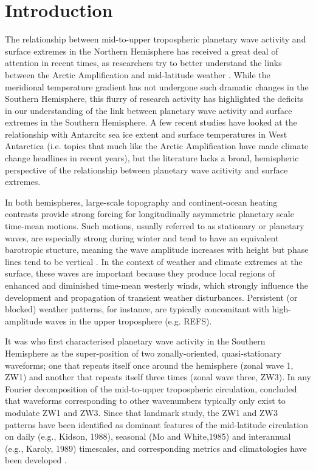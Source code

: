 \section{Introduction}\label{s:introduction}

The relationship between mid-to-upper tropospheric planetary wave activity and surface extremes in the Northern Hemisphere has received a great deal of attention in recent times, as researchers try to better understand the links between the Arctic Amplification and mid-latitude weather \citep[e.g.][]{Cohen2014,Screen2014}. While the meridional temperature gradient has not undergone such dramatic changes in the Southern Hemisphere, this flurry of research activity has highlighted the deficits in our understanding of the link between planetary wave activity and surface extremes in the Southern Hemisphere. A few recent studies have looked at the relationship with Antarcitc sea ice extent \citep{Raphael2007,Raphael2014} and surface temperatures in West Antarctica \citep{Ding2011,Ding2013} (i.e. topics that much like the Arctic Amplification have made climate change headlines in recent years), but the literature lacks a broad, hemispheric perspective of the relationship between planetary wave acitivity and surface extremes. 

In both hemispheres, large-scale topography and continent-ocean heating contrasts provide strong forcing for longitudinally asymmetric planetary scale time-mean motions. Such motions, usually referred to as stationary or planetary waves, are especially strong during winter and tend to have an equivalent barotropic stucture, meaning the wave amplitude increases with height but phase lines tend to be vertical \citep{Holton2013}. In the context of weather and climate extremes at the surface, these waves are important because they produce local regions of enhanced and diminished time-mean westerly winds, which strongly influence the development and propagation of transient weather disturbances. Persistent (or blocked) weather patterns, for instance, are typically concomitant with high-amplitude waves in the upper troposphere (e.g. REFS).

It was \citet{vanLoon1972} who first characterised planetary wave activity in the Southern Hemisphere as the super-position of two zonally-oriented, quasi-stationary waveforms; one that repeats itself once around the hemisphere (zonal wave 1, ZW1) and another that repeats itself three times (zonal wave three, ZW3). In any Fourier decomposition of the mid-to-upper tropospheric circulation, \citet{vanLoon1972} concluded that waveforms corresponding to other wavenumbers typically only exist to modulate ZW1 and ZW3. Since that landmark study, the ZW1 and ZW3 patterns have been identified as dominant features of the mid-latitude circulation on daily (e.g., Kidson, 1988), seasonal (Mo and White,1985) and interannual (e.g., Karoly, 1989) timescales, and corresponding metrics and climatologies have been developed \citep{Raphael2004,Hobbs2007}.

